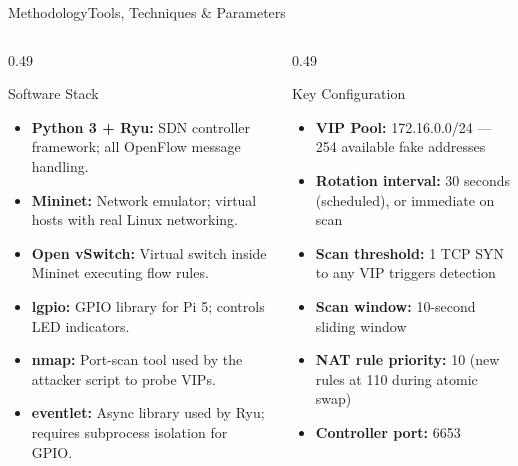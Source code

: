 \documentclass[aspectratio=169,10pt]{beamer}
\begin{document}
\begin{frame}{Methodology}{Tools, Techniques \& Parameters}
  \begin{columns}[T]
    \begin{column}{0.49\textwidth}
      \begin{block}{Software Stack}
        \begin{itemize}\small\setlength\itemsep{4pt}
          \item \textbf{Python 3 + Ryu:} SDN controller framework; all OpenFlow message handling.
          \item \textbf{Mininet:} Network emulator; virtual hosts with real Linux networking.
          \item \textbf{Open vSwitch:} Virtual switch inside Mininet executing flow rules.
          \item \textbf{lgpio:} GPIO library for Pi 5; controls LED indicators.
          \item \textbf{nmap:} Port-scan tool used by the attacker script to probe VIPs.
          \item \textbf{eventlet:} Async library used by Ryu; requires subprocess isolation for GPIO.
        \end{itemize}
      \end{block}
    \end{column}
    \begin{column}{0.49\textwidth}
      \begin{exampleblock}{Key Configuration}
        \begin{itemize}\small\setlength\itemsep{4pt}
          \item \textbf{VIP Pool:} 172.16.0.0/24 — 254 available fake addresses
          \item \textbf{Rotation interval:} 30 seconds (scheduled), or immediate on scan
          \item \textbf{Scan threshold:} 1 TCP SYN to any VIP triggers detection
          \item \textbf{Scan window:} 10-second sliding window
          \item \textbf{NAT rule priority:} 10 (new rules at 110 during atomic swap)
          \item \textbf{Controller port:} 6653
        \end{itemize}
      \end{exampleblock}
    \end{column}
  \end{columns}
\end{frame}
\end{document}
